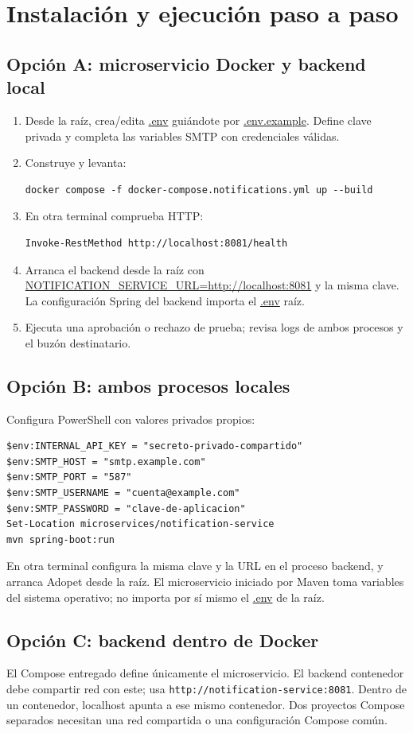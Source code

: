 \documentclass[11pt,a4paper]{article}
\newcommand{\pathcode}[1]{\small\url{#1}}\newcommand{\envvar}[1]{\small\url{#1}}
\begin{document}
\section{Instalación y ejecución paso a paso}
\subsection{Opción A: microservicio Docker y backend local}
\begin{enumerate}
\item Desde la raíz, crea/edita \pathcode{.env} guiándote por \pathcode{.env.example}. Define clave privada y completa las variables SMTP con credenciales válidas.
\item Construye y levanta:
\begin{lstlisting}
docker compose -f docker-compose.notifications.yml up --build
\end{lstlisting}
\item En otra terminal comprueba HTTP:
\begin{lstlisting}
Invoke-RestMethod http://localhost:8081/health
\end{lstlisting}
\item Arranca el backend desde la raíz con \envvar{NOTIFICATION_SERVICE_URL=http://localhost:8081} y la misma clave. La configuración Spring del backend importa el \pathcode{.env} raíz.
\item Ejecuta una aprobación o rechazo de prueba; revisa logs de ambos procesos y el buzón destinatario.
\end{enumerate}
\subsection{Opción B: ambos procesos locales}
Configura PowerShell con valores privados propios:
\begin{lstlisting}
$env:INTERNAL_API_KEY = "secreto-privado-compartido"
$env:SMTP_HOST = "smtp.example.com"
$env:SMTP_PORT = "587"
$env:SMTP_USERNAME = "cuenta@example.com"
$env:SMTP_PASSWORD = "clave-de-aplicacion"
Set-Location microservices/notification-service
mvn spring-boot:run
\end{lstlisting}
En otra terminal configura la misma clave y la URL en el proceso backend, y arranca Adopet desde la raíz. El microservicio iniciado por Maven toma variables del sistema operativo; no importa por sí mismo el \pathcode{.env} de la raíz.

\subsection{Opción C: backend dentro de Docker}
El Compose entregado define únicamente el microservicio. El backend contenedor debe compartir red con este; usa \texttt{http://notification-service:8081}. Dentro de un contenedor, localhost apunta a ese mismo contenedor. Dos proyectos Compose separados necesitan una red compartida o una configuración Compose común.
\end{document}
